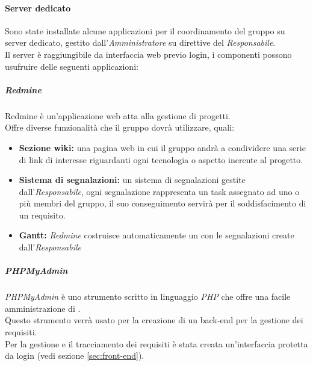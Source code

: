 \documentclass{scalatekids-article}
\begin{document}
\paragraph{Server dedicato}
\label{sec:server}
Sono state installate alcune applicazioni per il coordinamento del gruppo su
server dedicato, gestito dall'\textit{Amministratore} su direttive del
\textit{Responsabile}.\\ Il server è raggiungibile da interfaccia web previo
login, i componenti possono usufruire delle seguenti applicazioni:

\subparagraph{Redmine}
Redmine è un'applicazione web atta alla gestione di progetti.\\
Offre diverse funzionalità che il gruppo dovrà utilizzare, quali:
\begin{itemize}
\item\textbf{Sezione wiki:} una pagina web in cui il gruppo andrà a condividere una serie di link di interesse riguardanti ogni tecnologia o aspetto inerente al progetto.
\item\textbf{Sistema di segnalazioni:} un sistema di segnalazioni gestite dall'\textit{Responsabile}, ogni segnalazione rappresenta un task assegnato ad uno o più membri del gruppo, il suo conseguimento servirà per il soddisfacimento di un requisito.
\item\textbf{Gantt:} \textit{Redmine} costruisce automaticamente un  con le segnalazioni create dall'\textit{Responsabile}
\end{itemize}

\subparagraph{PHPMyAdmin}
\textit{PHPMyAdmin} è uno strumento scritto in linguaggio \textit{PHP} che offre una facile amministrazione di \textit{}.\\
Questo strumento verrà usato per la creazione di un back-end per la gestione dei requisiti.\\
Per la gestione e il tracciamento dei requisiti è stata creata un'interfaccia protetta da login (vedi sezione \ref{sec:front-end}).
\end{document}
